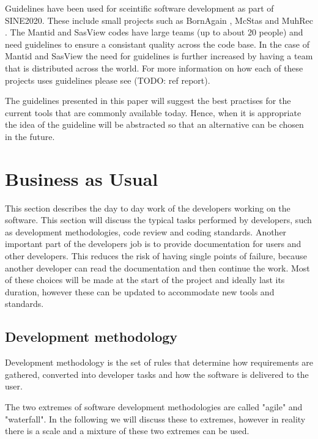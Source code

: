 \documentclass[jnr]{iosart2x}
\begin{document}
Guidelines have been used for sceintific software development as part of SINE2020.
These include small projects such as BornAgain \cite{}, McStas \cite{} and MuhRec \cite{Kaestner_2011}.
The Mantid \cite{Mantid} and SasView \cite{SasView} codes have large teams (up to about 20 people) and need guidelines to ensure a consistant quality across the code base.
In the case of Mantid and SasView the need for guidelines is further increased by having a team that is distributed across the world.
For more information on how each of these projects uses guidelines please see \cite{} (TODO: ref report).

The guidelines presented in this paper will suggest the best practises for the current tools that are commonly available today.
Hence, when it is appropriate the idea of the guideline will be abstracted so that an alternative can be chosen in the future.

\section{Business as Usual}
\label{Business as Usual}

This section describes the day to day work of the developers working on the software. 
This section will discuss the typical tasks performed by developers, such as development methodologies, code review and coding standards.
Another important part of the developers job is to provide documentation for users and other developers.
This reduces the risk of having single points of failure, because another developer can read the documentation and then continue the work.
Most of these choices will be made at the start of the project and ideally last its duration, however these can be updated to accommodate new tools and standards.

\subsection{Development methodology}
\label{Development methodology}

Development methodology is the set of rules that determine how requirements are gathered, converted into developer tasks and how the software is delivered to the user.

The two extremes of software development methodologies are called "agile" and "waterfall".
In the following we will discuss these to extremes, however in reality there is a scale and a mixture of these two extremes can be used.
\end{document}
